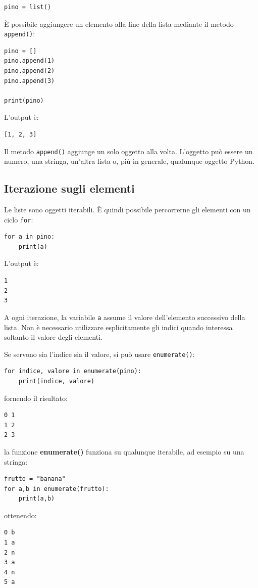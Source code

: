 \documentclass[11pt,a4paper]{book}
\begin{document}
\begin{lstlisting}[style=python]
pino = list()
\end{lstlisting}

È possibile aggiungere un elemento alla fine della lista mediante il metodo \texttt{append()}:

\begin{lstlisting}[style=python]
pino = []
pino.append(1)
pino.append(2)
pino.append(3)

print(pino)
\end{lstlisting}

L'output è:

\begin{lstlisting}[style=python, numbers=none]
[1, 2, 3]
\end{lstlisting}

Il metodo \texttt{append()} aggiunge un solo oggetto alla volta. L'oggetto può essere un numero, una stringa, un'altra lista o, più in generale, qualunque oggetto Python.

\subsection{Iterazione sugli elementi}

Le liste sono oggetti iterabili. È quindi possibile percorrerne gli elementi con un ciclo \texttt{for}:

\begin{lstlisting}[style=python]
for a in pino:
    print(a)
\end{lstlisting}

L'output è:

\begin{lstlisting}[style=output, numbers=none]
1
2
3
\end{lstlisting}

A ogni iterazione, la variabile \texttt{a} assume il valore dell'elemento successivo della lista. Non è necessario utilizzare esplicitamente gli indici quando interessa soltanto il valore degli elementi.

Se servono sia l'indice sia il valore, si può usare \texttt{enumerate()}:

\begin{lstlisting}[style=python]
for indice, valore in enumerate(pino):
    print(indice, valore)
\end{lstlisting}
fornendo il risultato:
\begin{lstlisting}[style=output, numbers=none]
0 1
1 2
2 3
\end{lstlisting}
la funzione \textbf{enumerate()} funziona su qualunque iterabile, ad esempio su una stringa:
\begin{lstlisting}[style=python]
frutto = "banana"
for a,b in enumerate(frutto):
    print(a,b)
\end{lstlisting}
ottenendo:
\begin{lstlisting}[style=output, numbers=none]
0 b
1 a
2 n
3 a
4 n
5 a
\end{lstlisting}
\end{document}
